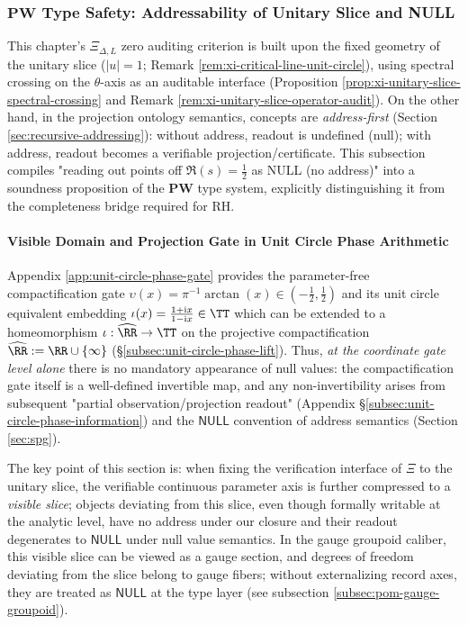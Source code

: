 \subsubsection{\texorpdfstring{$\mathbf{PW}$}{PW} Type Safety: Addressability of Unitary Slice and NULL}\label{subsec:xi-pw-type-safety-null}
This chapter's \(\Xi_{\Delta,L}\) zero auditing criterion is built upon the fixed geometry of the unitary slice (\(|u|=1\); Remark \ref{rem:xi-critical-line-unit-circle}), using spectral crossing on the \(\theta\)-axis as an auditable interface (Proposition \ref{prop:xi-unitary-slice-spectral-crossing} and Remark \ref{rem:xi-unitary-slice-operator-audit}).
On the other hand, in the projection ontology semantics, concepts are \emph{address-first} (Section \ref{sec:recursive-addressing}): without address, readout is undefined (null); with address, readout becomes a verifiable projection/certificate.
This subsection compiles "reading out points off \(\Re(s)=\tfrac12\) as NULL (no address)" into a soundness proposition of the \(\mathbf{PW}\) type system, explicitly distinguishing it from the completeness bridge required for RH.

\paragraph{Visible Domain and Projection Gate in Unit Circle Phase Arithmetic}
Appendix \ref{app:unit-circle-phase-gate} provides the parameter-free compactification gate
\(\upsilon(x)=\pi^{-1}\arctan(x)\in(-\tfrac12,\tfrac12)\)
and its unit circle equivalent embedding
\(\iota(x)=\frac{1+\mathrm{i}x}{1-\mathrm{i}x}\in\TT\)
which can be extended to a homeomorphism \(\iota:\widehat{\RR}\to\TT\) on the projective compactification \(\widehat{\RR}:=\RR\cup\{\infty\}\) (\S\ref{subsec:unit-circle-phase-lift}).
Thus, \emph{at the coordinate gate level alone} there is no mandatory appearance of null values: the compactification gate itself is a well-defined invertible map, and any non-invertibility arises from subsequent "partial observation/projection readout" (Appendix \S\ref{subsec:unit-circle-phase-information}) and the \(\mathsf{NULL}\) convention of address semantics (Section \ref{sec:spg}).
\par
The key point of this section is: when fixing the verification interface of \(\Xi\) to the unitary slice, the verifiable continuous parameter axis is further compressed to a \emph{visible slice}; objects deviating from this slice, even though formally writable at the analytic level, have no address under our closure and their readout degenerates to \(\mathsf{NULL}\) under null value semantics.
In the gauge groupoid caliber, this visible slice can be viewed as a gauge section, and degrees of freedom deviating from the slice belong to gauge fibers; without externalizing record axes, they are treated as \(\mathsf{NULL}\) at the type layer (see subsection \ref{subsec:pom-gauge-groupoid}).

